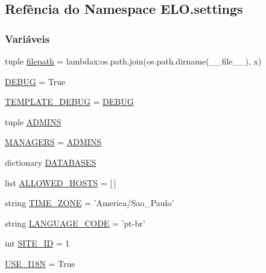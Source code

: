 \hypertarget{namespaceELO_1_1settings}{\subsection{Refência do Namespace E\-L\-O.\-settings}
\label{namespaceELO_1_1settings}
}
\subsubsection*{Variáveis}
\begin{DoxyCompactItemize}
\item 
tuple \hyperlink{namespaceELO_1_1settings_a7730264ddd478343e0f282f36d4a5ab4}{filepath} = lambdax\-:os.\-path.\-join(os.\-path.\-dirname(\-\_\-\-\_\-file\-\_\-\-\_\-), x)
\item 
\hyperlink{namespaceELO_1_1settings_a62f457ac29cc6f3e85282c71ce3b4f26}{D\-E\-B\-U\-G} = True
\item 
\hyperlink{namespaceELO_1_1settings_a014930e0bf77feccc65c20212593381e}{T\-E\-M\-P\-L\-A\-T\-E\-\_\-\-D\-E\-B\-U\-G} = \hyperlink{namespaceELO_1_1settings_a62f457ac29cc6f3e85282c71ce3b4f26}{D\-E\-B\-U\-G}
\item 
tuple \hyperlink{namespaceELO_1_1settings_a051220bd8105ba13b2720df11c1950ba}{A\-D\-M\-I\-N\-S}
\item 
\hyperlink{namespaceELO_1_1settings_a43e8826e0b24e337065b4975f3eace4c}{M\-A\-N\-A\-G\-E\-R\-S} = \hyperlink{namespaceELO_1_1settings_a051220bd8105ba13b2720df11c1950ba}{A\-D\-M\-I\-N\-S}
\item 
dictionary \hyperlink{namespaceELO_1_1settings_a91ed1425b7f1cf041960832ce5b54b6e}{D\-A\-T\-A\-B\-A\-S\-E\-S}
\item 
list \hyperlink{namespaceELO_1_1settings_afd72644768367440ae1a89e9fe95cde5}{A\-L\-L\-O\-W\-E\-D\-\_\-\-H\-O\-S\-T\-S} = \mbox{[}$\,$\mbox{]}
\item 
string \hyperlink{namespaceELO_1_1settings_aafd318ffa70db1890eaf1f8621e19d53}{T\-I\-M\-E\-\_\-\-Z\-O\-N\-E} = 'America/Sao\-\_\-\-Paulo'
\item 
string \hyperlink{namespaceELO_1_1settings_a388841a63bae5418e55fb741f938d4fb}{L\-A\-N\-G\-U\-A\-G\-E\-\_\-\-C\-O\-D\-E} = 'pt-\/br'
\item 
int \hyperlink{namespaceELO_1_1settings_a31328123344da3768e97b0ac61c342de}{S\-I\-T\-E\-\_\-\-I\-D} = 1
\item 
\hyperlink{namespaceELO_1_1settings_a2d03ced1be44b9d7937bdbc870474ffe}{U\-S\-E\-\_\-\-I18\-N} = True
\item 

\end{DoxyCompactItemize}
